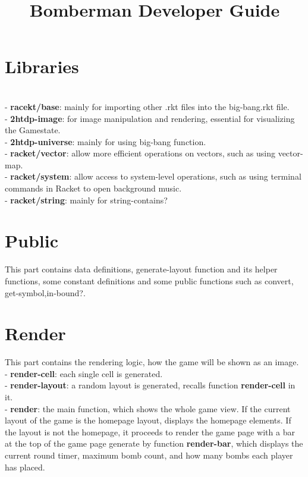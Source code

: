\documentclass[12pt]{article}
\title{\fontsize{30}{24}\selectfont \textbf{Bomberman Developer Guide}} %
\author{}
\date{}
\begin{document}
\maketitle

\section{Libraries}
\hspace{1.27cm}
\\
- \textbf{racekt/base}: mainly for importing other .rkt files into the big-bang.rkt file.\\
- \textbf{2htdp-image}: for image manipulation and rendering, essential for visualizing the Gamestate.\\
- \textbf{2htdp-universe}: mainly for using big-bang function.\\
- \textbf{racket/vector}: allow more efficient operations on vectors, such as using vector-map.\\
- \textbf{racket/system}: allow access to system-level operations, such as using terminal commands in Racket to open background music.\\
- \textbf{racket/string}: mainly for string-contains?\\

\section{Public}
\hspace{1.27cm}This part contains data definitions, generate-layout function and its helper functions, some constant definitions and some public functions such as convert, get-symbol,in-bound?.

\section{Render}
\hspace{1.27cm}
This part contains the rendering logic, how the game will be shown as an image. \\
- \textbf{render-cell}: each single cell is generated. \\
- \textbf{render-layout}: a random layout is generated, recalls function \textbf{render-cell} in it.\\
- \textbf{render}: the main function, which shows the whole game view. If the current layout of the game is the homepage layout, displays the homepage elements. If the layout is not the homepage, it proceeds to render the game page with a bar at the top of the game page generate by function \textbf{render-bar}, which displays the current round timer, maximum bomb count, and how many bombs each player has placed.
\end{document}
